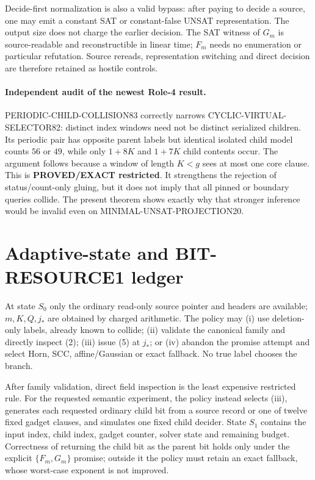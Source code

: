 \documentclass[11pt]{article}
\begin{document}
Decide-first normalization is also a valid bypass: after paying to decide a
source, one may emit a constant SAT or constant-false UNSAT representation.
The output size does not charge the earlier decision.  The SAT witness of
$G_m$ is source-readable and reconstructible in linear time; $F_m$ needs no
enumeration or particular refutation.  Source rereads, representation
switching and direct decision are therefore retained as hostile controls.

\paragraph{Independent audit of the newest Role-4 result.}
PERIODIC-CHILD-COLLISION83 correctly narrows CYCLIC-VIRTUAL-SELECTOR82:
distinct index windows need not be distinct serialized children.  Its
periodic pair has opposite parent labels but identical isolated child model
counts $56$ or $49$, while only $1+8K$ and $1+7K$ child contents occur.
The argument follows because a window of length $K<g$ sees at most one core
clause.  This is \textbf{PROVED/EXACT restricted}.  It strengthens the
rejection of status/count-only gluing, but it does not imply that all pinned
or boundary queries collide.  The present theorem shows exactly why that
stronger inference would be invalid even on MINIMAL-UNSAT-PROJECTION20.

\section{Adaptive-state and BIT-RESOURCE1 ledger}
At state $S_0$ only the ordinary read-only source pointer and headers are
available; $m,K,Q,j_*$ are obtained by charged arithmetic.  The policy may
(i) use deletion-only labels, already known to collide; (ii) validate the
canonical family and directly inspect (2); (iii) issue (5) at $j_*$; or
(iv) abandon the promise attempt and select Horn, SCC, affine/Gaussian or
exact fallback.  No true label chooses the branch.

After family validation, direct field inspection is the least expensive
restricted rule.  For the requested semantic experiment, the policy instead
selects (iii), generates each requested ordinary child bit from a source
record or one of twelve fixed gadget clauses, and simulates one fixed child
decider.  State $S_1$ contains the input index, child index, gadget counter,
solver state and remaining budget.  Correctness of returning the child bit as
the parent bit holds only under the explicit $\{F_m,G_m\}$ promise; outside
it the policy must retain an exact fallback, whose worst-case exponent is not
improved.
\end{document}
